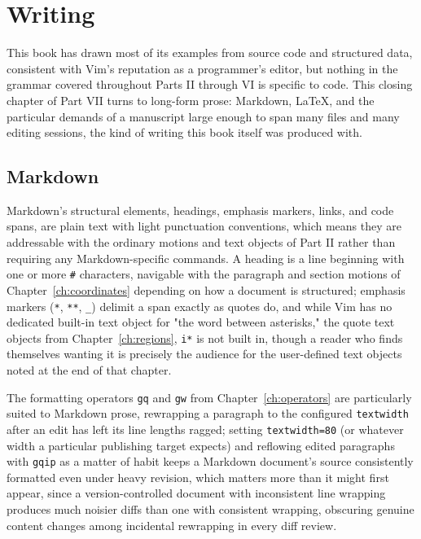 \chapter{Writing}
\label{ch:writing}

This book has drawn most of its examples from source code and structured data, consistent with Vim's reputation as a programmer's editor, but nothing in the grammar covered throughout Parts II through VI is specific to code. This closing chapter of Part VII turns to long-form prose: Markdown, LaTeX, and the particular demands of a manuscript large enough to span many files and many editing sessions, the kind of writing this book itself was produced with.

\section{Markdown}

Markdown's structural elements, headings, emphasis markers, links, and code spans, are plain text with light punctuation conventions, which means they are addressable with the ordinary motions and text objects of Part II rather than requiring any Markdown-specific commands. A heading is a line beginning with one or more \texttt{\#} characters, navigable with the paragraph and section motions of Chapter~\ref{ch:coordinates} depending on how a document is structured; emphasis markers (\texttt{*}, \texttt{**}, \texttt{\_}) delimit a span exactly as quotes do, and while Vim has no dedicated built-in text object for "the word between asterisks," the quote text objects from Chapter~\ref{ch:regions}, \texttt{i*} is not built in, though a reader who finds themselves wanting it is precisely the audience for the user-defined text objects noted at the end of that chapter.

The formatting operators \texttt{gq} and \texttt{gw} from Chapter~\ref{ch:operators} are particularly suited to Markdown prose, rewrapping a paragraph to the configured \texttt{textwidth} after an edit has left its line lengths ragged; setting \texttt{textwidth=80} (or whatever width a particular publishing target expects) and reflowing edited paragraphs with \texttt{gqip} as a matter of habit keeps a Markdown document's source consistently formatted even under heavy revision, which matters more than it might first appear, since a version-controlled document with inconsistent line wrapping produces much noisier diffs than one with consistent wrapping, obscuring genuine content changes among incidental rewrapping in every diff review.

